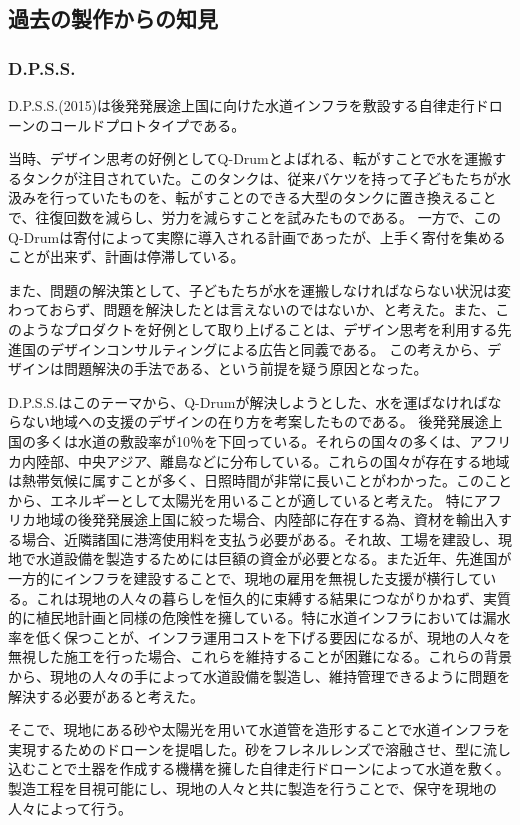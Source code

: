 \documentclass{jsarticle}
\begin{document}
\subsection{過去の製作からの知見}

\subsubsection{D.P.S.S.}
D.P.S.S.(2015)は後発発展途上国に向けた水道インフラを敷設する自律走行ドローンのコールドプロトタイプである。

当時、デザイン思考の好例としてQ-Drumとよばれる、転がすことで水を運搬するタンクが注目されていた。このタンクは、従来バケツを持って子どもたちが水汲みを行っていたものを、転がすことのできる大型のタンクに置き換えることで、往復回数を減らし、労力を減らすことを試みたものである。
一方で、このQ-Drumは寄付によって実際に導入される計画であったが、上手く寄付を集めることが出来ず、計画は停滞している。

また、問題の解決策として、子どもたちが水を運搬しなければならない状況は変わっておらず、問題を解決したとは言えないのではないか、と考えた。また、このようなプロダクトを好例として取り上げることは、デザイン思考を利用する先進国のデザインコンサルティングによる広告と同義である。
この考えから、デザインは問題解決の手法である、という前提を疑う原因となった。

D.P.S.S.はこのテーマから、Q-Drumが解決しようとした、水を運ばなければならない地域への支援のデザインの在り方を考案したものである。
後発発展途上国の多くは水道の敷設率が10％を下回っている。それらの国々の多くは、アフリカ内陸部、中央アジア、離島などに分布している。これらの国々が存在する地域は熱帯気候に属すことが多く、日照時間が非常に長いことがわかった。このことから、エネルギーとして太陽光を用いることが適していると考えた。
特にアフリカ地域の後発発展途上国に絞った場合、内陸部に存在する為、資材を輸出入する場合、近隣諸国に港湾使用料を支払う必要がある。それ故、工場を建設し、現地で水道設備を製造するためには巨額の資金が必要となる。また近年、先進国が一方的にインフラを建設することで、現地の雇用を無視した支援が横行している。これは現地の人々の暮らしを恒久的に束縛する結果につながりかねず、実質的に植民地計画と同様の危険性を擁している。特に水道インフラにおいては漏水率を低く保つことが、インフラ運用コストを下げる要因になるが、現地の人々を無視した施工を行った場合、これらを維持することが困難になる。これらの背景から、現地の人々の手によって水道設備を製造し、維持管理できるように問題を解決する必要があると考えた。

そこで、現地にある砂や太陽光を用いて水道管を造形することで水道インフラを実現するためのドローンを提唱した。砂をフレネルレンズで溶融させ、型に流し込むことで土器を作成する機構を擁した自律走行ドローンによって水道を敷く。製造工程を目視可能にし、現地の人々と共に製造を行うことで、保守を現地の人々によって行う。
\end{document}

